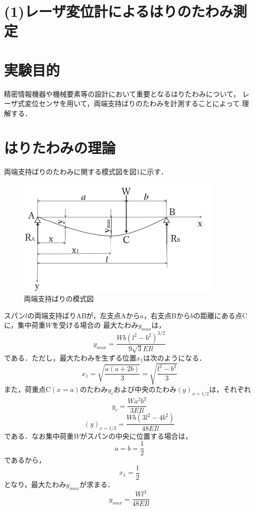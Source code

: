 \documentclass[a4paper,11pt]{jsarticle}
\begin{document}
\section*{(1)レーザ変位計によるはりのたわみ測定}

\section{実験目的}
精密情報機器や機械要素等の設計において重要となるはりたわみについて，
レーザ式変位センサを用いて，両端支持ばりのたわみを計測することによって
理解する．

\section{はりたわみの理論}
両端支持ばりのたわみに関する模式図を図1に示す．

\begin{figure}[h]
  \centering
  \includegraphics[width=10cm]{AB.png}
  \caption{両端支持ばりの模式図}
\end{figure}
スパン$l$の両端支持ばりABが，左支点Aから$a$，右支点Bから$b$の距離にある点Cに，集中荷重$W$を受ける場合の
最大たわみ$y_{max}$は，
\begin{equation}
  y_{max} = {\dfrac{Wb({l^2}-{b^2})^{3/2}}{9\sqrt{3}EIl}}
\end{equation}
である．ただし，最大たわみを生ずる位置$x_1$は次のようになる．
\begin{equation}
  x_1 = {\sqrt{\dfrac{a(a+2b)}{3}}}={\sqrt{\dfrac{{l^2}-{b^2}}{3}}}
\end{equation}
また，荷重点C$(x=a)$のたわみ$y_c$および中央のたわみ$(y)_{x={1/2}}$は，それぞれ
\begin{equation}
  y_{c} = {\dfrac{Wa^{2}b^{2}}{3EIl}}
\end{equation}
\begin{equation}
  (y)_{x={1/2}} = {\dfrac{Wb(3l^{2}-4b^{2})}{48EIl}}
\end{equation}
である．なお集中荷重$W$がスパンの中央に位置する場合は，
\begin{equation}
  a = b = \dfrac{1}{2}
\end{equation}
であるから，
\begin{equation}
  x_1 = \dfrac{1}{2}
\end{equation}
となり，最大たわみ$y_{max}$が求まる．
\begin{equation}
  y_{max} = {\dfrac{Wl^{3}}{48EIl}}
\end{equation}
\end{document}
